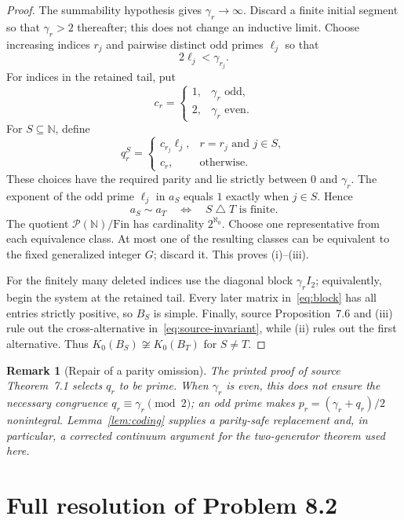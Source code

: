 \documentclass[11pt]{article}
\newtheorem{remark}[theorem]{Remark}
\newcommand{\N}{\mathbb N}
\begin{document}
\begin{proof}
The summability hypothesis gives $\gamma_r\to\infty$. Discard a finite initial segment so that $\gamma_r>2$ thereafter; this does not change an inductive limit. Choose increasing indices $r_j$ and pairwise distinct odd primes $\ell_j$ so that
\[
  2\ell_j<\gamma_{r_j}.
\]
For indices in the retained tail, put
\[
  c_r=\begin{cases}
       1,&\gamma_r\text{ odd},\\
       2,&\gamma_r\text{ even}.
      \end{cases}
\]
For $S\subseteq\N$, define
\[
 q_r^S=
 \begin{cases}
   c_{r_j}\ell_j,&r=r_j\text{ and }j\in S,\\
   c_r,&\text{otherwise}.
 \end{cases}
\]
These choices have the required parity and lie strictly between $0$ and $\gamma_r$. The exponent of the odd prime $\ell_j$ in $a_S$ equals $1$ exactly when $j\in S$. Hence
\[
  a_S\sim a_T \quad\Longleftrightarrow\quad S\mathbin{\triangle}T\text{ is finite}.
\]
The quotient $\mathcal P(\N)/\mathrm{Fin}$ has cardinality $2^{\aleph_0}$. Choose one representative from each equivalence class. At most one of the resulting classes can be equivalent to the fixed generalized integer $G$; discard it. This proves (i)--(iii).

For the finitely many deleted indices use the diagonal block $\gamma_rI_2$; equivalently, begin the system at the retained tail. Every later matrix in~\eqref{eq:block} has all entries strictly positive, so $B_S$ is simple. Finally, source Proposition~7.6 and (iii) rule out the cross-alternative in~\eqref{eq:source-invariant}, while (ii) rules out the first alternative. Thus $K_0(B_S)\not\cong K_0(B_T)$ for $S\ne T$.
\end{proof}

\begin{remark}[Repair of a parity omission]
The printed proof of source Theorem~7.1 selects $q_r$ to be prime. When $\gamma_r$ is even, this does not ensure the necessary congruence $q_r\equiv\gamma_r\pmod 2$; an odd prime makes $p_r=(\gamma_r+q_r)/2$ nonintegral. Lemma~\ref{lem:coding} supplies a parity-safe replacement and, in particular, a corrected continuum argument for the two-generator theorem used here.
\end{remark}

\section{Full resolution of Problem 8.2}
\end{document}
